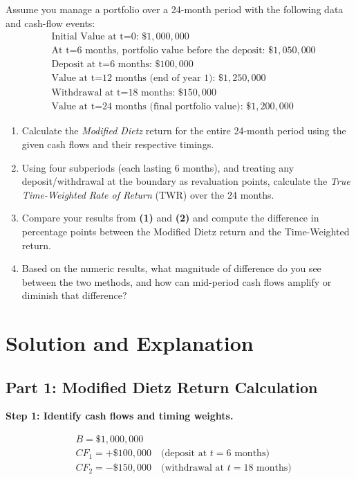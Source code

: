 Assume you manage a portfolio over a 24-month period with the following data and cash-flow events:
\[
\begin{aligned}
&\text{Initial Value at t=0: } \$1{,}000{,}000 \\
&\text{At t=6 months, portfolio value before the deposit: } \$1{,}050{,}000 \\
&\text{Deposit at t=6 months: } \$100{,}000 \\
&\text{Value at t=12 months (end of year 1): } \$1{,}250{,}000 \\
&\text{Withdrawal at t=18 months: } \$150{,}000 \\
&\text{Value at t=24 months (final portfolio value): } \$1{,}200{,}000
\end{aligned}
\]

\begin{enumerate}
  \item Calculate the \textit{Modified Dietz} return for the entire 24-month period using the given cash flows and their respective timings.
  \item Using four subperiods (each lasting 6 months), and treating any deposit/withdrawal at the boundary as revaluation points, calculate the \textit{True Time-Weighted Rate of Return} (TWR) over the 24 months.
  \item Compare your results from \textbf{(1)} and \textbf{(2)} and compute the difference in percentage points between the Modified Dietz return and the Time-Weighted return.
  \item Based on the numeric results, what magnitude of difference do you see between the two methods, and how can mid-period cash flows amplify or diminish that difference?
\end{enumerate}

\section*{Solution and Explanation}

\subsection*{Part 1: Modified Dietz Return Calculation}

\noindent \textbf{Step 1: Identify cash flows and timing weights.}

\[
\begin{aligned}
& B = \$1{,}000{,}000 \\
& CF_{1} = +\$100{,}000 \quad \text{(deposit at } t=6 \text{ months)} \\
& CF_{2} = -\$150{,}000 \quad \text{(withdrawal at } t=18 \text{ months)}
\end{aligned}
\]

